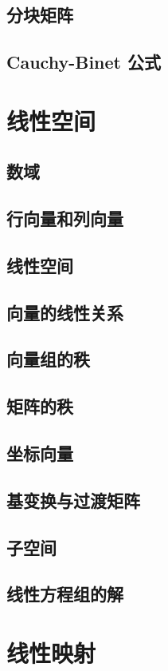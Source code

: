 \documentclass[a4paper, 11pt]{ctexbook}
\begin{document}
        \section{分块矩阵}
        \section{Cauchy-Binet 公式}
    \chapter{线性空间}
        \section{数域}
        \section{行向量和列向量}
        \section{线性空间}
        \section{向量的线性关系}
        \section{向量组的秩}
        \section{矩阵的秩}
        \section{坐标向量}
        \section{基变换与过渡矩阵}
        \section{子空间}
        \section{线性方程组的解}
    \chapter{线性映射}
\end{document}
